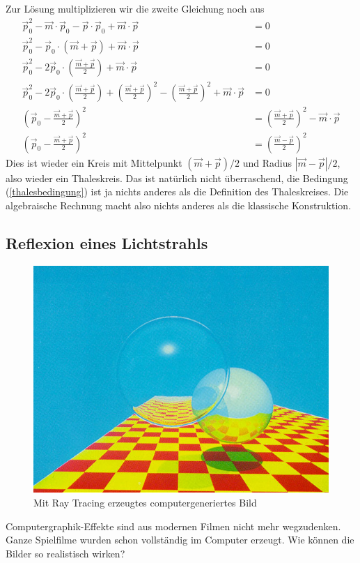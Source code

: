 Zur Lösung multiplizieren wir die zweite Gleichung noch aus
\begin{align*}
\vec p_0^2-\vec m\cdot\vec p_0-\vec p\cdot\vec p_0+\vec m\cdot\vec p&=0
\\
\vec p_0^2-\vec p_0\cdot (\vec m+\vec p)+\vec m\cdot\vec p&=0
\\
\vec p_0^2-2\vec p_0\cdot \left(\frac{\vec m+\vec p}{2}\right)+\vec m\cdot\vec p&=0
\\
\vec p_0^2-2\vec p_0\cdot \left(\frac{\vec m+\vec p}{2}\right)+
\left(\frac{\vec m+\vec p}2\right)^2
-\left(\frac{\vec m+\vec p}2\right)^2
+\vec m\cdot\vec p&=0
\\
\left(\vec p_0- \frac{\vec m+\vec p}{2}\right)^2
&=
\left(\frac{\vec m+\vec p}2\right)^2
-\vec m\cdot\vec p
\\
\left(\vec p_0- \frac{\vec m+\vec p}{2}\right)^2
&=
\left(\frac{\vec m-\vec p}2\right)^2
\end{align*}
Dies ist wieder ein Kreis mit Mittelpunkt $(\vec m+\vec p)/2$ und
Radius $|\vec m-\vec p|/2$, also wieder ein Thaleskreis.
Das ist natürlich nicht überraschend, die Bedingung (\ref{thalesbedingung})
ist ja nichts anderes als die Definition des Thaleskreises.
Die algebraische Rechnung macht also nichts anderes als die klassische
Konstruktion.

%
%
\subsection{Reflexion eines Lichtstrahls}
\begin{figure}
\begin{center}
\includegraphics[width=1\hsize]{graphics/raytracing}
\end{center}
\caption{Mit Ray Tracing erzeugtes computergeneriertes Bild\label{raytracing}}
\end{figure}
Computergraphik-Effekte sind aus modernen Filmen nicht mehr wegzudenken.
Ganze Spielfilme wurden schon vollständig im Computer erzeugt.
Wie können die Bilder so realistisch wirken?

